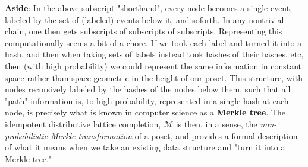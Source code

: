 \documentclass[hoptionsi,review,format=sigplan]{acmart}
\theoremstyle{definition}
\newcommand{\Mcc}{\mathcal{M}}
\begin{document}
\textbf{Aside}: In the above subscript "shorthand", every node becomes a single event, labeled by the set of (labeled) events below it, and soforth. In any nontrivial chain, one then gets subscripts of subscripts of subscripts. Representing this computationally seems a bit of a chore. If we took each label and turned it into a hash, and then when taking sets of labels instead took hashes of their hashes, etc, then (with high probability) we could represent the same information in constant space rather than space geometric in the height of our poset. This structure, with nodes recursively labeled by the hashes of the nodes below them, such that all "path" information is, to high probability, represented in a single hash at each node, is precisely what is known in computer science as a \textbf{Merkle tree}. The idempotent distributive lattice completion, \(\Mcc\) is then, in a sense, the \textit{non-probabilistic Merkle transformation} of a poset, and provides a formal description of what it means when we take an existing data structure and "turn it into a Merkle tree."














\end{document}
